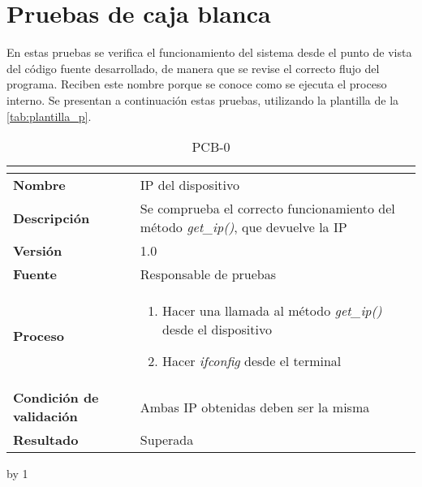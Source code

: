 \section{Pruebas de caja blanca}\label{sec:pruebas-de-caja-blanca}
En estas pruebas se verifica el funcionamiento del sistema desde el punto de vista del código fuente desarrollado, de manera que se revise el correcto flujo del programa. Reciben este nombre porque se conoce como se ejecuta el proceso interno. Se presentan a continuación estas pruebas, utilizando la plantilla de la \autoref{tab:plantilla_p}.

\newcount\pcb
{}
\begin{table}[H]
	\caption{PCB-0\number\pcb}
	\begin{tabular}{|l|p{}|}
		\hline
		\multicolumn{2}{|c|}{\cellcolor[HTML]{BFBFBF}{\color[HTML]{000000} \textbf{PCB-0\number\pcb}}} \\ \hline
		\textbf{Nombre}                  & IP del dispositivo                                                                        \\ \hline
		\textbf{Descripción}             & Se comprueba el correcto funcionamiento del método \textit{get\_ip()}, que devuelve la IP \\ \hline
		\textbf{Versión}                 & 1.0                                                                                       \\ \hline
		\textbf{Fuente}                  & Responsable de pruebas                                                                    \\ \hline
		\textbf{Proceso}                 & \begin{enumerate}
			\item Hacer una llamada al método \textit{get\_ip()} desde el dispositivo
			\item Hacer \textit{ifconfig} desde el terminal
		\end{enumerate}                                                                 \\ \hline
		\textbf{Condición de validación} & Ambas IP obtenidas deben ser la misma                                                     \\ \hline
		\textbf{Resultado}               & Superada                                                                                  \\ \hline
	\end{tabular}
\end{table}
\advance\pcb by 1
